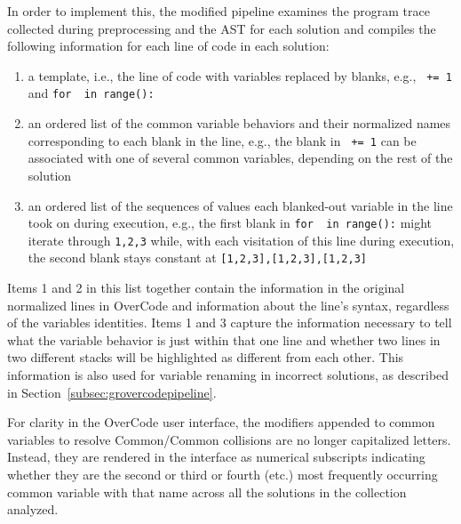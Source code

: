 In order to implement this, the modified pipeline examines the program trace collected during preprocessing and the AST for each solution and compiles the following information for each line of code in each solution:
\begin{enumerate}
\item a template, i.e., the line of code with variables replaced by blanks, e.g., \texttt{\underline{\hspace{1em}} += 1} and \texttt{for \underline{\hspace{1em}} in range(\underline{\hspace{1em}}):}
\item an ordered list of the common variable behaviors and their normalized names corresponding to each blank in the line, e.g., the blank in \texttt{\underline{\hspace{1em}} += 1} can be associated with one of several common variables, depending on the rest of the solution
\item an ordered list of the sequences of values each blanked-out variable in the line took on during execution, e.g., the first blank in \texttt{for \underline{\hspace{1em}} in range(\underline{\hspace{1em}}):} might iterate through \texttt{1,2,3} while, with each visitation of this line during execution, the second blank stays constant at \texttt{[1,2,3],[1,2,3],[1,2,3]}
\end{enumerate}
Items 1 and 2 in this list together contain the information in the original normalized lines in OverCode and information about the line's syntax, regardless of the variables identities. Items 1 and 3 capture the information necessary to tell what the variable behavior is just within that one line and whether two lines in two different stacks will be highlighted as different from each other. This information is also used for variable renaming in incorrect solutions, as described in Section~\ref{subsec:grovercodepipeline}.

For clarity in the OverCode user interface, the modifiers appended to common variables to resolve Common/Common collisions are no longer capitalized letters. Instead, they are rendered in the interface as numerical subscripts indicating whether they are the second or third or fourth (etc.) most frequently occurring common variable with that name across all the solutions in the collection analyzed.

